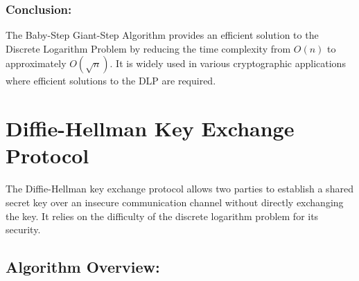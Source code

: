 \documentclass[11pt]{article}
\begin{document}
\subsubsection{Conclusion:}

The Baby-Step Giant-Step Algorithm provides an efficient solution to the Discrete Logarithm Problem by reducing the time complexity from $O(n)$ to approximately $O(\sqrt{n})$. It is widely used in various cryptographic applications where efficient solutions to the DLP are required.

\section{Diffie-Hellman Key Exchange Protocol}

The Diffie-Hellman key exchange protocol allows two parties to establish a shared secret key over an insecure communication channel without directly exchanging the key. It relies on the difficulty of the discrete logarithm problem for its security.

\subsection{Algorithm Overview:}
\end{document}

